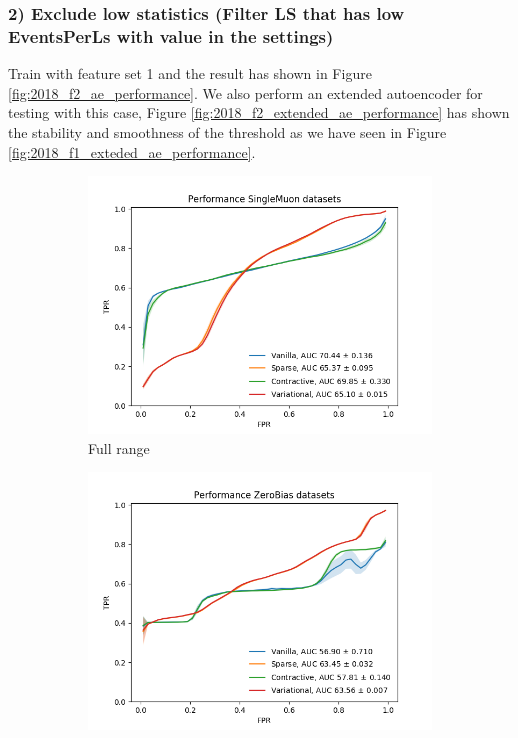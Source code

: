 \subsubsection{2) Exclude low statistics (Filter LS that has low EventsPerLs with value in the settings)}
Train with feature set 1 and the result has shown in Figure \ref{fig:2018_f2_ae_performance}.
We also perform an extended autoencoder for testing with this case, Figure \ref{fig:2018_f2_extended_ae_performance} has shown the stability and smoothness of the threshold as we have seen in Figure \ref{fig:2018_f1_exteded_ae_performance}.

\begin{figure}[h!]
\centering
    \begin{subfigure}[b]{0.49\linewidth}
        \includegraphics[width=\linewidth]{images/reco/2018/feature_2/performance_SingleMuon_VanillaSparseContractiveVariational.png}
        \caption{Full range}
    \end{subfigure}
    \begin{subfigure}[b]{0.49\linewidth}
        \includegraphics[width=\linewidth]{images/reco/2018/feature_2/performance_ZeroBias_VanillaSparseContractiveVariational.png}

\end{subfigure}
\end{figure}
